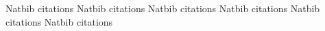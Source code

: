 Natbib citations \citep{NatbibP}
Natbib citations \citet{NatbibT}
Natbib citations \citep*{NatbibPStar}
Natbib citations \citet*{NatbibTStar}
Natbib citations \citeauthor{NatbibAuthor}
Natbib citations \citeyear{NatbibYear}

